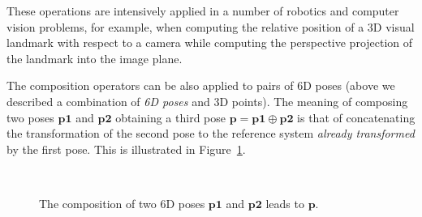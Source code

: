 \documentclass[a4paper,10pt]{report}
\begin{document}
These operations are intensively applied in a number of robotics and computer vision 
problems, for example, when computing the relative position of a 3D visual landmark 
with respect to a camera while computing the perspective projection of the landmark 
into the image plane.

The composition operators can be also applied to pairs of 6D poses (above we described a combination
of \emph{6D poses} and {3D points}). 
The meaning of composing two poses $\mathbf{p1}$ and $\mathbf{p2}$ 
obtaining a third pose $\mathbf{p} = \mathbf{p1} \oplus \mathbf{p2}$ 
is that of concatenating the transformation of the second pose to the reference system
\emph{already transformed} by the first pose. 
This is illustrated in Figure~\ref{fig:comp_2poses}. 

\begin{figure}
\centering
{}
 \\

\caption{The composition of two 6D poses $\mathbf{p1}$ and $\mathbf{p2}$ leads to $\mathbf{p}$.}
\label{fig:comp_2poses}
\end{figure}
\end{document}
